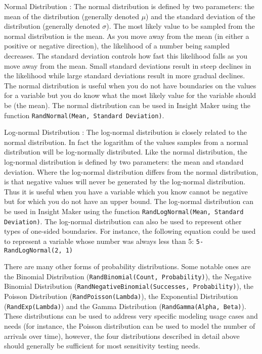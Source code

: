 \documentclass[]{memoir}
\begin{document}
Normal Distribution : The normal distribution is defined by two
parameters: the mean of the distribution (generally denoted $\mu$) and
the standard deviation of the distribution (generally denoted $\sigma$).
The most likely value to be sampled from the normal distribution is the
mean. As you move away from the mean (in either a positive or negative
direction), the likelihood of a number being sampled decreases. The
standard deviation controls how fast this likelihood falls as you move
away from the mean. Small standard deviations result in steep declines
in the likelihood while large standard deviations result in more gradual
declines. The normal distribution is useful when you do not have
boundaries on the values for a variable but you do know what the most
likely value for the variable should be (the mean). The normal
distribution can be used in Insight Maker using the function
\lstinline!RandNormal(Mean, Standard Deviation)!.

Log-normal Distribution : The log-normal distribution is closely related
to the normal distribution. In fact the logarithm of the values samples
from a normal distribution will be log-normally distributed. Like the
normal distribution, the log-normal distribution is defined by two
parameters: the mean and standard deviation. Where the log-normal
distribution differs from the normal distribution, is that negative
values will never be generated by the log-normal distribution. Thus it
is useful when you have a variable which you know cannot be negative but
for which you do not have an upper bound. The log-normal distribution
can be used in Insight Maker using the function
\lstinline!RandLogNormal(Mean, Standard Deviation)!. The log-normal
distribution can also be used to represent other types of one-sided
boundaries. For instance, the following equation could be used to
represent a variable whose number was always less than 5:
\lstinline!5-RandLogNormal(2, 1)!

There are many other forms of probability distributions. Some notable
ones are the Binomial Distribution
(\lstinline!RandBinomial(Count, Probability)!), the Negative Binomial
Distribution (\lstinline!RandNegativeBinomial(Successes, Probability)!),
the Poisson Distribution (\lstinline!RandPoisson(Lambda)!), the
Exponential Distribution (\lstinline!RandExp(Lambda)!) and the Gamma
Distribution (\lstinline!RandGamma(Alpha, Beta)!). These distributions
can be used to address very specific modeling usage cases and needs (for
instance, the Poisson distribution can be used to model the number of
arrivals over time), however, the four distributions described in detail
above should generally be sufficient for most sensitivity testing needs.
\end{document}
